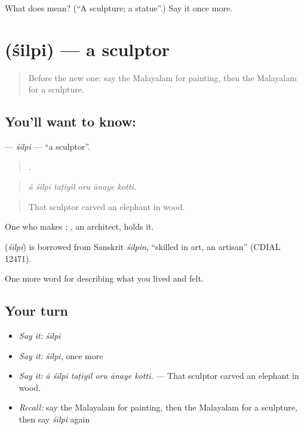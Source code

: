 \begin{tcolorbox}[breakable,colback=teal!4,colframe=teal!35!black,title={Before you move on}]
What does  mean? (\textquotedblleft{}A sculpture; a statue\textquotedblright{}.) Say it once more.
\end{tcolorbox}
\section[\texorpdfstring{\ml{ശില്പി} (śilpi)}{ശില്പി (śilpi)}]{ (śilpi) — a sculptor}

\label{lesson:ML-C560-silpi}



\begin{quote}
Before the new one: say the Malayalam for painting, then the Malayalam for a sculpture.
\end{quote}

\subsection*{You'll want to know: }
\textbf{} — \emph{śilpi} — \textquotedblleft{}a sculptor\textquotedblright{}.

\begin{quote}
     .
\end{quote}

\begin{quote}
\emph{ā śilpi taṭiyil oru ānaye kotti.}
\end{quote}

\begin{quote}
That sculptor carved an elephant in wood.
\end{quote}

One who makes ; , an architect, holds it.

\begin{cousinweb}
\textbf{} (\emph{śilpi}) is borrowed from Sanskrit \emph{śilpin}, \textquotedblleft{}skilled in art, an artisan\textquotedblright{} (CDIAL 12471).
\end{cousinweb}

\begin{grammarlens}[title={What you've built}]
One more word for describing what you lived and felt.
\end{grammarlens}

\subsection*{Your turn}
\begin{itemize}
\raggedright
  \item \emph{Say it:} \emph{śilpi}
  \item \emph{Say it:} \emph{śilpi}, once more
  \item \emph{Say it:} \emph{ā śilpi taṭiyil oru ānaye kotti.} — That sculptor carved an elephant in wood.
  \item \emph{Recall:} say the Malayalam for painting, then the Malayalam for a sculpture, then say \emph{śilpi} again
\end{itemize}

